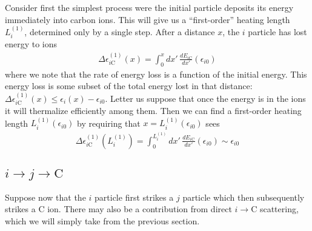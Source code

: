 \documentclass{article}
\begin{document}
Consider first the simplest process were the initial particle deposits its energy immediately into carbon ions. This will give us a ``first-order'' heating length $L_i^{(1)}$, determined only by a single step. After a distance $x$, the $i$ particle has lost energy to ions
\begin{align}
\Delta \epsilon_{i\text{C}}^{(1)}(x) = \int_0^x dx'\, \frac{dE_{i\text{C}}}{dx'}(\epsilon_{i0})
\end{align}
where we note that the rate of energy loss is a function of the initial energy. This energy loss is some subset of the total energy lost in that distance: $\Delta \epsilon_{i\text{C}}^{(1)}(x) \leq \epsilon_{i}(x) - \epsilon_{i0}$. Letter us suppose that once the energy is in the ions it will thermalize efficiently among them. Then we can find a first-order heating length $L_i^{(1)}(\epsilon_{i0})$ by requiring that $x = L_i^{(1)}(\epsilon_{i0})$ sees
\begin{align}
\Delta \epsilon_{i\text{C}}^{(1)}(L_i^{(1)}) = \int_0^{L_i^{(1)}} dx'\, \frac{dE_{i\text{C}}}{dx'}(\epsilon_{i0}) \sim \epsilon_{i0}
\end{align}

\subsection{$i\to j\to\text{C}$}

Suppose now that the $i$ particle first strikes a $j$ particle which then subsequently strikes a $\text{C}$ ion. There may also be a contribution from direct $i \to\text{C}$ scattering, which we will simply take from the previous section.
\end{document}
